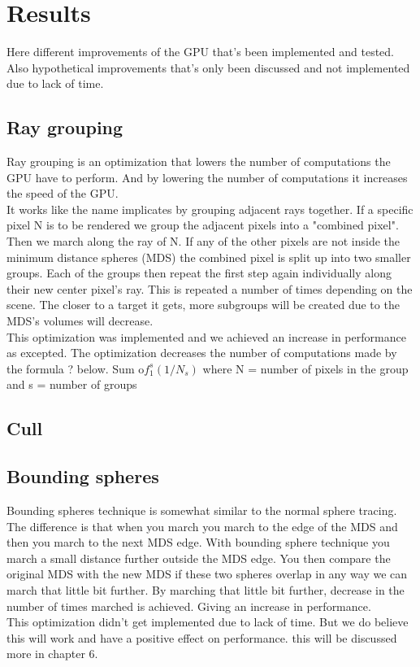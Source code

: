 \chapter{Results}

	Here different improvements of the GPU that's been implemented and tested. Also
	hypothetical improvements that's only been discussed and not implemented due to
	lack of time.  

	\section{Ray grouping}
	
		Ray grouping is an optimization that lowers the number of computations the
		GPU have to perform. And by lowering the number of computations it
		increases the speed of the GPU.\\ It works like the name implicates by
		grouping adjacent rays together. If a specific pixel N is to be rendered we
		group the adjacent pixels into a "combined pixel". Then we march along the
		ray of N. If any of the other pixels are not inside the minimum distance
		spheres (MDS) the combined pixel is split up into two smaller groups. Each
		of the groups then repeat the first step again individually along their new
		center pixel's ray. This is repeated a number of times depending on the
		scene. The closer to a target it gets, more subgroups will be created due
		to the MDS's volumes will decrease.\\ This optimization was implemented and
		we achieved an increase in performance as excepted. The optimization
		decreases the number of computations made by the formula ? below.  Sum
		o$f_1^s(1/N_s)$ where N = number of pixels in the group and s = number of
		groups
	
	
	\section{Cull}
	
	\section{Bounding spheres}

		Bounding spheres technique is somewhat similar to the normal sphere
		tracing. The difference is that when you march you march to the edge of the
		MDS and then you march to the next MDS edge. With bounding sphere technique
		you march a small distance further outside the MDS edge. You then compare
		the original MDS with the new MDS if these two spheres overlap in any way
		we can march that little bit further. By marching that little bit further,
		decrease in the number of times marched is achieved. Giving an increase in
		performance.  \\ This optimization didn't get implemented due to lack of
		time. But we do believe this will work and have a positive effect on
		performance. this will be discussed more in chapter 6.
	
